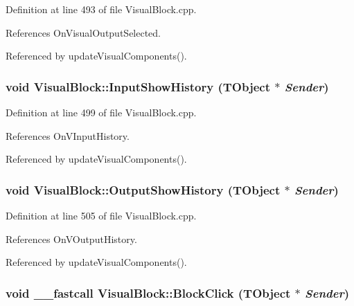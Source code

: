 Definition at line 493 of file VisualBlock.cpp.

References OnVisualOutputSelected.

Referenced by updateVisualComponents().\hypertarget{classVisualBlock_0dd05c49185b9c4ed3c2067c2887207c}{
\subsubsection[InputShowHistory]{\setlength{\rightskip}{0pt plus 5cm}void VisualBlock::InputShowHistory (TObject $\ast$ {\em Sender})}}
\label{classVisualBlock_0dd05c49185b9c4ed3c2067c2887207c}




Definition at line 499 of file VisualBlock.cpp.

References OnVInputHistory.

Referenced by updateVisualComponents().\hypertarget{classVisualBlock_a06f4f819f1ffb8210552be1b2588241}{
\subsubsection[OutputShowHistory]{\setlength{\rightskip}{0pt plus 5cm}void VisualBlock::OutputShowHistory (TObject $\ast$ {\em Sender})}}
\label{classVisualBlock_a06f4f819f1ffb8210552be1b2588241}




Definition at line 505 of file VisualBlock.cpp.

References OnVOutputHistory.

Referenced by updateVisualComponents().\hypertarget{classVisualBlock_92cda5ed352c37bdf35821d733a9eec0}{
\subsubsection[BlockClick]{\setlength{\rightskip}{0pt plus 5cm}void \_\-\_\-fastcall VisualBlock::BlockClick (TObject $\ast$ {\em Sender})}}
\label{classVisualBlock_92cda5ed352c37bdf35821d733a9eec0}




